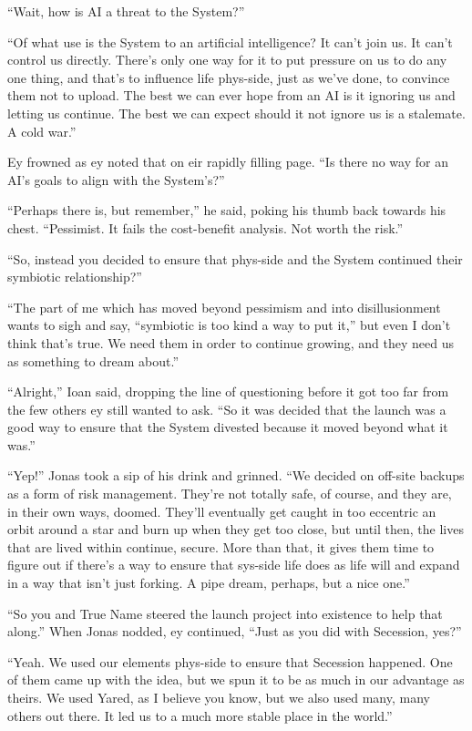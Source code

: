 ``Wait, how is AI a threat to the System?''

``Of what use is the System to an artificial intelligence? It can't join us. It can't control us directly. There's only one way for it to put pressure on us to do any one thing, and that's to influence life phys-side, just as we've done, to convince them not to upload. The best we can ever hope from an AI is it ignoring us and letting us continue. The best we can expect should it not ignore us is a stalemate. A cold war.''

Ey frowned as ey noted that on eir rapidly filling page. ``Is there no way for an AI's goals to align with the System's?''

``Perhaps there is, but remember,'' he said, poking his thumb back towards his chest. ``Pessimist. It fails the cost-benefit analysis. Not worth the risk.''

``So, instead you decided to ensure that phys-side and the System continued their symbiotic relationship?''

``The part of me which has moved beyond pessimism and into disillusionment wants to sigh and say, ``symbiotic is too kind a way to put it,'' but even I don't think that's true. We need them in order to continue growing, and they need us as something to dream about.''

``Alright,'' Ioan said, dropping the line of questioning before it got too far from the few others ey still wanted to ask. ``So it was decided that the launch was a good way to ensure that the System divested because it moved beyond what it was.''

``Yep!'' Jonas took a sip of his drink and grinned. ``We decided on off-site backups as a form of risk management. They're not totally safe, of course, and they are, in their own ways, doomed. They'll eventually get caught in too eccentric an orbit around a star and burn up when they get too close, but until then, the lives that are lived within continue, secure. More than that, it gives them time to figure out if there's a way to ensure that sys-side life does as life will and expand in a way that isn't just forking. A pipe dream, perhaps, but a nice one.''

``So you and True Name steered the launch project into existence to help that along.'' When Jonas nodded, ey continued, ``Just as you did with Secession, yes?''

``Yeah. We used our elements phys-side to ensure that Secession happened. One of them came up with the idea, but we spun it to be as much in our advantage as theirs. We used Yared, as I believe you know, but we also used many, many others out there. It led us to a much more stable place in the world.''

